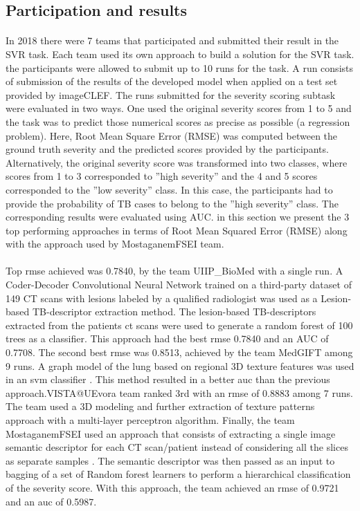 \subsection{Participation and results}
\paragraph{}
In 2018 there were 7 teams that participated and submitted their result in the SVR task. Each team used its own approach to build a solution for the SVR task. the participants were allowed to submit up to 10 runs for the task. A run consists of submission
of the results of the developed model when applied on a test set provided by imageCLEF. The runs submitted for the severity scoring subtask were evaluated in two ways. One used the original severity scores from 1 to 5 and the task was to predict those numerical scores as precise as possible (a regression problem). Here, Root Mean Square Error (RMSE) was computed between the ground truth severity and the predicted scores provided by the participants. Alternatively, the original severity score was transformed into two classes, where scores from 1 to 3 corresponded to ”high severity” and the 4 and 5 scores corresponded to the ”low severity” class. In this case, the participants had to provide the probability of TB cases to belong to the ”high severity” class. The corresponding results were evaluated using AUC. in this section we present the 3 top performing approaches in terms of Root Mean Squared Error (RMSE) along with the approach used by MostaganemFSEI team.
\paragraph{}
Top \acs{rmse} achieved was 0.7840, by the team UIIP\_BioMed with a single run. A Coder-Decoder Convolutional Neural Network trained on a third-party dataset of 149 CT scans with lesions labeled by a qualified radiologist was used as a Lesion-based TB-descriptor extraction method. The lesion-based TB-descriptors extracted from the patients \acs{ct} scans were used to generate a random forest of 100 trees as a classifier\cite{lesionBased}. This approach had the best \acs{rmse} 0.7840 and an AUC of 0.7708. The second best \acs{rmse} was 0.8513, achieved by the team MedGIFT among 9 runs. A graph model of the lung based on regional 3D texture features was used in an \acs{svm} classifier \cite{textureBasedGraphModel}. This method resulted in a better \acs{auc} than the previous approach.VISTA@UEvora team ranked 3rd with an \acs{rmse} of 0.8883 among 7 runs. The team used a 3D modeling and further extraction of texture patterns approach with a multi-layer perceptron algorithm\cite{textureBased3DModel}.
Finally, the team MostaganemFSEI used an approach that consists of extracting a single image semantic descriptor for each CT scan/patient instead of considering all the slices as separate samples \cite{semanticDescriptor}. The semantic descriptor was then passed as an input to bagging of a set of Random forest learners to perform a hierarchical classification of the severity score. With this approach, the team achieved an \acs{rmse} of 0.9721 and an \acs{auc} of 0.5987.

